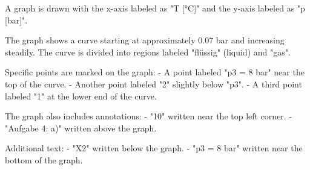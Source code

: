 A graph is drawn with the x-axis labeled as "T [°C]" and the y-axis labeled as "p [bar]".  

The graph shows a curve starting at approximately 0.07 bar and increasing steadily. The curve is divided into regions labeled "flüssig" (liquid) and "gas".  

Specific points are marked on the graph:  
- A point labeled "p3 = 8 bar" near the top of the curve.  
- Another point labeled "2" slightly below "p3".  
- A third point labeled "1" at the lower end of the curve.  

The graph also includes annotations:  
- "10" written near the top left corner.  
- "Aufgabe 4: a)" written above the graph.  

Additional text:  
- "X2" written below the graph.  
- "p3 = 8 bar" written near the bottom of the graph.